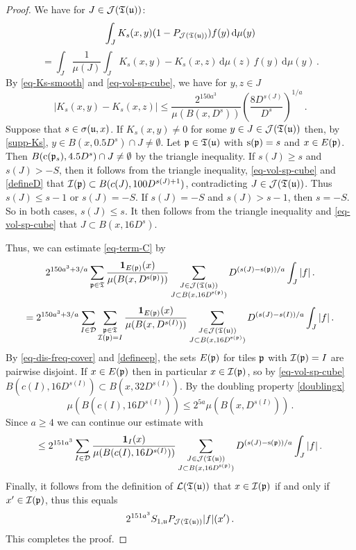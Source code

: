 {\begin{proof}
    We have for $J \in \mathcal{J}({\mathfrak T}({\mathfrak u}))$:
    $$
        \int_J K_{s}(x,y)(1 - P_{\mathcal{J}({\mathfrak T}({\mathfrak u}))})f(y) \, \mathrm{d}\mu(y)
    $$
    \begin{equation}
    \label{eq-canc-comp}
        =  \int_J \frac{1}{\mu(J)} \int_J K_s(x,y) - K_s(x,z) \, \mathrm{d}\mu(z) \,f(y) \, \mathrm{d}\mu(y)\,.
    \end{equation}
    By \eqref{eq-Ks-smooth} and \eqref{eq-vol-sp-cube}, we have for $y, z \in J$
    $$
        |K_s(x,y) - K_s(x,z)| \le \frac{2^{150a^3}}{\mu(B(x, D^s))} \left(\frac{8 D^{s(J)}}{D^s}\right)^{1/a}\,.
    $$
    Suppose that $s \in \sigma({\mathfrak u}, x)$.
    If $K_s(x,y) \ne 0$ for some $y \in J \in \mathcal{J}({\mathfrak T}({\mathfrak u}))$ then, by \eqref{supp-Ks}, $y \in B(x, 0.5 D^s) \cap J \ne \emptyset$. Let ${\mathfrak p} \in {\mathfrak T}({\mathfrak u})$ with ${\mathrm{s}}({\mathfrak p}) = s$ and $x \in E({\mathfrak p})$. Then $B({\mathrm{c}}({\mathfrak p}_s), 4.5D^s) \cap J \ne \emptyset$ by the triangle inequality. If $s(J) \ge s$ and $s(J) > -S$, then it follows from the triangle inequality, \eqref{eq-vol-sp-cube} and \eqref{defineD} that ${\mathcal{I}}({\mathfrak p}) \subset B(c(J), 100 D^{s(J)+1})$, contradicting $J \in \mathcal{J}(\mathfrak{T}({\mathfrak u}))$. Thus $s(J) \le s - 1$ or $s(J) = -S$. If $s(J) = -S$ and $s(J) > s - 1$, then $s = -S$. So in both cases, $s(J) \le s$. It then follows from the triangle inequality and \eqref{eq-vol-sp-cube} that $J \subset B(x, 16 D^s)$.

    Thus, we can estimate \eqref{eq-term-C} by
    $$
        2^{150a^3 + 3/a}\sum_{{\mathfrak p}\in \mathfrak{T}}\frac{\mathbf{1}_{E({\mathfrak p})}(x)}{\mu(B(x,D^{{\mathrm{s}}({\mathfrak p})}))}\sum_{\substack{J\in \mathcal{J}({\mathfrak T}({\mathfrak u}))\\J\subset B(x,  16D^{{\mathrm{s}}({\mathfrak p})})}}  D^{(s(J) - {\mathrm{s}}({\mathfrak p}))/a} \int_J |f|\,.
    $$
    $$
        = 2^{150a^3 + 3/a}\sum_{I \in \mathcal{D}} \sum_{\substack{{\mathfrak p}\in \mathfrak{T}\\ {\mathcal{I}}({\mathfrak p}) = I}}\frac{\mathbf{1}_{E({\mathfrak p})}(x)}{\mu(B(x, D^{s(I)}))}\sum_{\substack{J\in \mathcal{J}({\mathfrak T}({\mathfrak u}))\\J\subset B(x,  16 D^{{\mathrm{s}}({\mathfrak p})})}}  D^{(s(J) - s(I))/a} \int_J |f|\,.
    $$
    By \eqref{eq-dis-freq-cover} and \eqref{defineep}, the sets $E({\mathfrak p})$ for tiles ${\mathfrak p}$ with ${\mathcal{I}}({\mathfrak p}) = I$ are pairwise disjoint.
    If $x \in E({\mathfrak p})$ then in particular $x \in {\mathcal{I}}({\mathfrak p})$, so by \eqref{eq-vol-sp-cube} $B(c(I),16D^{s(I)}) \subset B(x, 32D^{s(I)})$. By the doubling property \eqref{doublingx}
    $$
        \mu(B(c(I), 16D^{s(I)})) \le 2^{5a} \mu(B(x, D^{s(I)}))\,.
    $$
    Since $a \ge 4$ we can continue our estimate with
    $$
        \le 2^{151a^3}\sum_{I \in \mathcal{D}} \frac{\mathbf{1}_{I}(x)}{\mu(B(c(I),  16D^{s(I)}))}\sum_{\substack{J\in \mathcal{J}({\mathfrak T}({\mathfrak u}))\\J\subset B(x,  16 D^{{\mathrm{s}}({\mathfrak p})})}}  D^{(s(J) - {\mathrm{s}}({\mathfrak p}))/a} \int_J |f|\,.
    $$
    Finally, it follows from the definition of $\mathcal{L}({\mathfrak T}({\mathfrak u}))$ that $x \in {\mathcal{I}}({\mathfrak p})$ if and only if $x' \in {\mathcal{I}}({\mathfrak p})$, thus this equals
    $$
         2^{151a^3} S_{1,{\mathfrak u}} P_{\mathcal{J}({\mathfrak T}({\mathfrak u}))}|f|(x')\,.
    $$
    This completes the proof.
\end{proof}

}
